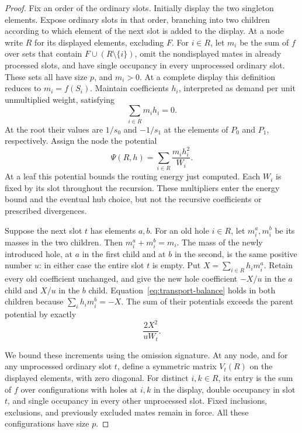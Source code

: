 \begin{proof}
Fix an order of the ordinary slots. Initially display the two
singleton elements. Expose ordinary slots in that order, branching
into two children according to which element of the next slot is
added to the display.
At a node write $R$ for its displayed elements, excluding $F$.
For $i\in R$, let $m_i$ be the sum of $f$ over sets that contain
$F\cup(R\setminus\{i\})$, omit the nondisplayed mates in already
processed slots, and have single occupancy in every unprocessed
ordinary slot. These sets all have size $p$, and $m_i>0$.
At a complete display this definition reduces to $m_i=f(S_i)$.
Maintain coefficients $h_i$, interpreted as demand per unit
unmultiplied weight, satisfying
\begin{equation}
  \sum_{i\in R}m_i h_i=0.
  \label{eq:transport-balance}
\end{equation}
At the root their values are $1/s_0$ and $-1/s_1$ at the elements of
$P_0$ and $P_1$, respectively. Assign the node the potential
\[
  \Psi(R,h)=\sum_{i\in R}\frac{m_i h_i^2}{W_i}.
\]
At a leaf this potential bounds the routing energy just computed. Each $W_i$
is fixed by its slot throughout the recursion. These multipliers
enter the energy bound and the eventual hub choice, but not the
recursive coefficients or prescribed divergences.

Suppose the next slot $t$ has elements $a,b$.
For an old hole $i\in R$, let $m_i^a,m_i^b$ be its masses in the two
children. Then $m_i^a+m_i^b=m_i$.
The mass of the newly introduced hole, at $a$ in the first child and
at $b$ in the second, is the same positive number $u$: in either case
the entire slot $t$ is empty.
Put $X=\sum_{i\in R}h_i m_i^a$.
Retain every old coefficient unchanged, and give the new hole
coefficient $-X/u$ in the $a$ child and $X/u$ in the $b$ child.
Equation~\eqref{eq:transport-balance} holds in both children because
$\sum_i h_i m_i^b=-X$.
The sum of their potentials exceeds the parent potential by exactly
\begin{equation}
  \frac{2X^2}{uW_t}.
  \label{eq:transport-increment}
\end{equation}

We bound these increments using the omission signature. At any node,
and for any unprocessed ordinary slot $t$, define a symmetric matrix
$V_t(R)$ on the displayed elements, with zero diagonal. For distinct
$i,k\in R$, its entry is the sum of $f$ over configurations with holes
at $i,k$ in the display, double occupancy in slot $t$, and single
occupancy in every other unprocessed slot. Fixed inclusions,
exclusions, and previously excluded mates remain in force.
All these configurations have size $p$.


\end{proof}
